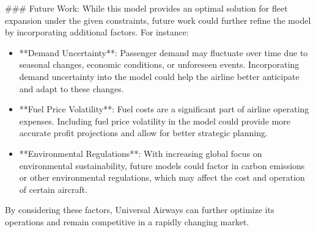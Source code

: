 ### Future Work:
While this model provides an optimal solution for fleet expansion under the given constraints, future work could further refine the model by incorporating additional factors. For instance:
\begin{itemize}
    \item **Demand Uncertainty**: Passenger demand may fluctuate over time due to seasonal changes, economic conditions, or unforeseen events. Incorporating demand uncertainty into the model could help the airline better anticipate and adapt to these changes.
    
    \item **Fuel Price Volatility**: Fuel costs are a significant part of airline operating expenses. Including fuel price volatility in the model could provide more accurate profit projections and allow for better strategic planning.
    
    \item **Environmental Regulations**: With increasing global focus on environmental sustainability, future models could factor in carbon emissions or other environmental regulations, which may affect the cost and operation of certain aircraft.
\end{itemize}

By considering these factors, Universal Airways can further optimize its operations and remain competitive in a rapidly changing market.
